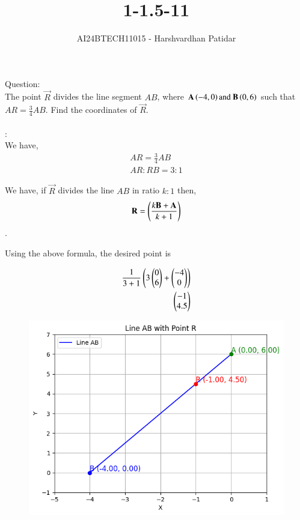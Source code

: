 \documentclass[journal]{IEEEtran}
\begin{document}

\vspace{3cm}

\title{1-1.5-11}
\author{AI24BTECH11015 - Harshvardhan Patidar}
{\let\newpage\relax\maketitle}

\renewcommand{\thefigure}{\theenumi}
\renewcommand{\thetable}{\theenumi}
\setlength{\intextsep}{10pt} %


\renewcommand{\thetable}{\theenumi}


	Question:\\
		The point $\vec{R}$ divides the line segment $AB$, where $\mathbf{A} \left(-4,0\right) \text{and } \mathbf{B} \left(0,6\right)$ such that $AR = \frac{3}{4}AB$. Find the coordinates of $\vec{R}$.
	\\
	\\
	\solution:\\

	We have,
	\begin{align}
		AR = \frac{3}{4} AB\\
		AR:RB = 3:1
	\end{align}

	We have, if $\vec{R}$ divides the line $AB$ in ratio $k:1$ then, $$\mathbf{R} = \left(\frac{k\mathbf{B} + \mathbf{A}}{k+1}\right)$$.

	Using the above formula, the desired point is

	\begin{align}
		\frac{1}{3+1}\left(3\begin{pmatrix}0\\6\end{pmatrix} + \begin{pmatrix}-4\\0\end{pmatrix}\right) \\
		\begin{pmatrix}-1\\4.5\end{pmatrix}
	\end{align}


	\begin{figure}[hbt!]
		\centering
		\includegraphics[width=0.6\linewidth]{plots/plot.png}

	\end{figure}
\end{document}
